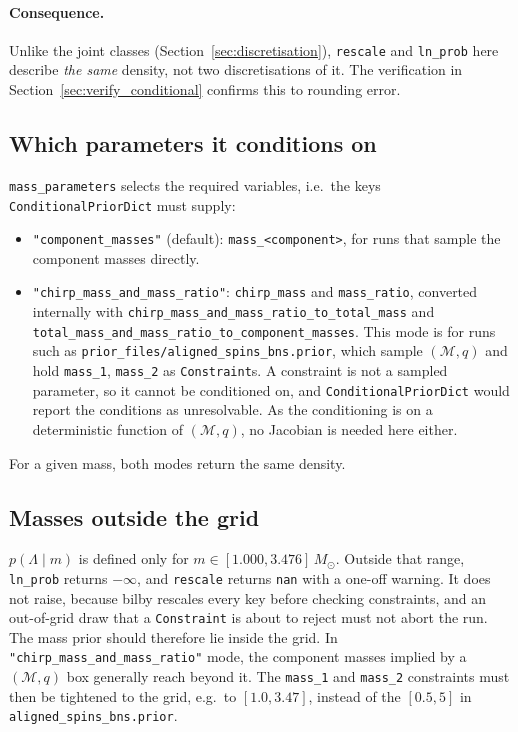 \documentclass[11pt,a4paper]{article}
\newcommand{\Mc}{\mathcal{M}}
\newcommand{\code}[1]{\texttt{#1}}
\begin{document}
\paragraph{Consequence.}
Unlike the joint classes (Section~\ref{sec:discretisation}), \code{rescale} and
\code{ln\_prob} here describe \emph{the same} density, not two
discretisations of it. The verification in Section~\ref{sec:verify_conditional}
confirms this to rounding error.

\subsection{Which parameters it conditions on}

\code{mass\_parameters} selects the required variables, i.e.\ the keys
\code{ConditionalPriorDict} must supply:
\begin{itemize}
  \item \code{"component\_masses"} (default): \code{mass\_<component>}, for runs
    that sample the component masses directly.
  \item \code{"chirp\_mass\_and\_mass\_ratio"}: \code{chirp\_mass} and
    \code{mass\_ratio}, converted internally with
    \code{chirp\_mass\_and\_mass\_ratio\_to\_total\_mass} and
    \code{total\_mass\_and\_mass\_ratio\_to\_component\_masses}. This mode is
    for runs such as \code{prior\_files/aligned\_spins\_bns.prior}, which
    sample $(\Mc, q)$ and hold \code{mass\_1}, \code{mass\_2} as
    \code{Constraint}s. A constraint is not a sampled parameter, so it cannot
    be conditioned on, and \code{ConditionalPriorDict} would report the
    conditions as unresolvable. As the conditioning is on a deterministic
    function of $(\Mc, q)$, no Jacobian is needed here either.
\end{itemize}
For a given mass, both modes return the same density.

\subsection{Masses outside the grid}

$p(\Lambda \mid m)$ is defined only for $m \in [1.000, 3.476]\,M_\odot$.
Outside that range, \code{ln\_prob} returns $-\infty$, and \code{rescale}
returns \code{nan} with a one-off warning. It does not raise, because bilby
rescales every key before checking constraints, and an out-of-grid draw that a
\code{Constraint} is about to reject must not abort the run. The mass prior
should therefore lie inside the grid. In
\code{"chirp\_mass\_and\_mass\_ratio"} mode, the component masses implied by a
$(\Mc, q)$ box generally reach beyond it. The \code{mass\_1} and \code{mass\_2}
constraints must then be tightened to the grid, e.g.\ to $[1.0, 3.47]$,
instead of the $[0.5, 5]$ in \code{aligned\_spins\_bns.prior}.
\end{document}
